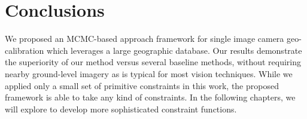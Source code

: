 

\section{Conclusions}

We proposed an MCMC-based approach framework for single image camera
geo-calibration which leverages a large geographic database. Our
results demonstrate the superiority of our method versus several
baseline methods, without requiring nearby ground-level imagery as is
typical for most vision techniques.
While we applied only a small set of primitive constraints in this work,  
the proposed framework is able to take any kind of constraints.
In the following chapters, we will explore to develop more sophisticated
constraint functions.

